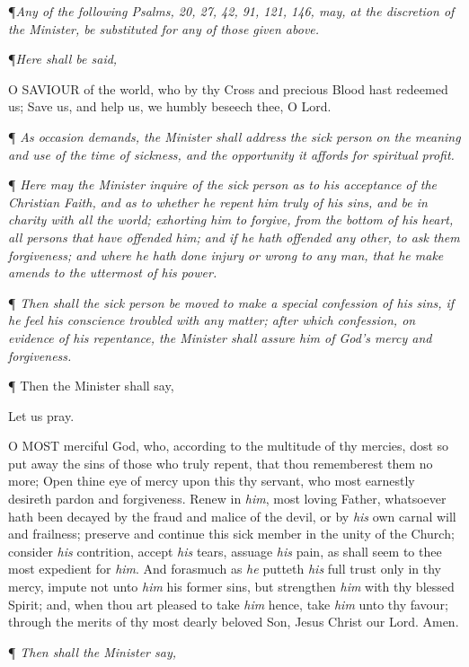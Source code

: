 ¶\emph{Any
of the following Psalms, 20, 27, 42, 91, 121, 146, may, at the discretion
of the Minister, be substituted for any of those given above.}

¶\emph{Here shall be said,}

O
SAVIOUR of the world, who by thy Cross and precious Blood hast redeemed
us; Save us, and help us, we humbly beseech thee, O Lord.

¶
\emph{As occasion demands, the Minister shall address the sick person
on the meaning and use of the time of sickness, and the opportunity
it affords for spiritual profit.}

¶ \emph{Here may the Minister inquire of the sick person as to his
acceptance of the Christian Faith, and as to whether he repent him truly
of his sins, and be in charity with all the world; exhorting him to
forgive, from the bottom of his heart, all persons that have offended
him; and if he hath offended any other, to ask them forgiveness; and
where he hath done injury or wrong to any man, that he make amends to
the uttermost of his power.}

¶ \emph{Then shall the sick person be moved to make a special confession
of his sins, if he feel his conscience troubled with any matter; after
which confession, on evidence of his repentance, the Minister shall
assure him of God's mercy and forgiveness.}

¶ Then the Minister shall say,

Let
us pray.

O
MOST merciful God, who, according to the multitude of thy mercies, dost
so put away the sins of those who truly repent, that thou rememberest
them no more; Open thine eye of mercy upon this thy servant, who most
earnestly desireth pardon and forgiveness. Renew in \emph{him}, most
loving Father, whatsoever hath been decayed by the fraud and malice
of the devil, or by \emph{his} own carnal will and frailness; preserve
and continue this sick member in the unity of the Church; consider \emph{his}
contrition, accept \emph{his} tears, assuage \emph{his} pain, as
shall seem to thee most expedient for \emph{him}. And forasmuch as
\emph{he} putteth \emph{his} full trust only in thy mercy, impute
not unto \emph{him} his former sins, but strengthen \emph{him} with
thy blessed Spirit; and, when thou art pleased to take \emph{him}
hence, take \emph{him} unto thy favour; through the merits of thy
most dearly beloved Son, Jesus Christ our Lord. Amen.

¶
\emph{Then shall the Minister say,}

